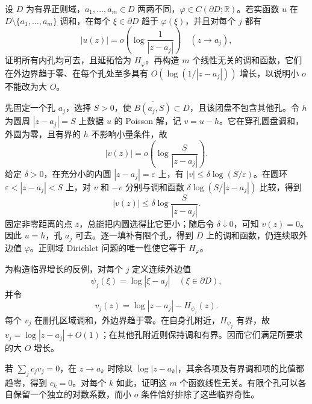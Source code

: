 \begin{exercise}[有限内孔的小对数增长与唯一性]\label{b3:ex:16-draft-04}
设 \(D\) 为有界正则域，\(a_1,\ldots,a_m\in D\) 两两不同，\(\varphi\in C(\partial D;\mathbb R)\)。若实函数 \(u\) 在 \(D\setminus\{a_1,\ldots,a_m\}\) 调和，在每个 \(\xi\in\partial D\) 趋于 \(\varphi(\xi)\)，并且对每个 \(j\) 都有
\[
 |u(z)|=o\!\left(\log\frac1{|z-a_j|}\right)\quad(z\to a_j),
\]
证明所有内孔均可去，且延拓恰为 \(H_\varphi\)。再构造 \(m\) 个线性无关的调和函数，它们在外边界趋于零、在每个孔处至多具有 \(O(\log(1/|z-a_j|))\) 增长，以说明小 \(o\) 不能改为大 \(O\)。
\end{exercise}
\begin{solution}
先固定一个孔 \(a_j\)，选择 \(S>0\)，使 \(\overline{B(a_j,S)}\subset D\)，且该闭盘不包含其他孔。令 \(h\) 为圆周 \(|z-a_j|=S\) 上数据 \(u\) 的 Poisson 解，记 \(v=u-h\)。它在穿孔圆盘调和，外圆为零，且有界的 \(h\) 不影响小量条件，故
\[
 |v(z)|=o\!\left(\log\frac S{|z-a_j|}\right).
\]
给定 \(\delta>0\)，在充分小的内圆 \(|z-a_j|=\varepsilon\) 上，有 \(|v|\le\delta\log(S/\varepsilon)\)。在圆环 \(\varepsilon<|z-a_j|<S\) 上，对 \(v\) 和 \(-v\) 分别与调和函数 \(\delta\log(S/|z-a_j|)\) 比较，得到
\[
 |v(z)|\le\delta\log\frac S{|z-a_j|}.
\]
固定非零距离的点 \(z\)，总能把内圆选得比它更小；随后令 \(\delta\downarrow0\)，可知 \(v(z)=0\)。因此 \(u=h\)，孔 \(a_j\) 可去。逐一填补有限个孔，得到 \(D\) 上的调和函数，仍连续取外边值 \(\varphi\)。正则域 Dirichlet 问题的唯一性使它等于 \(H_\varphi\)。

为构造临界增长的反例，对每个 \(j\) 定义连续外边值
\[
 \psi_j(\xi)=\log|\xi-a_j|\quad(\xi\in\partial D),
\]
并令
\[
 v_j(z)=\log|z-a_j|-H_{\psi_j}(z).
\]
每个 \(v_j\) 在删孔区域调和，外边界趋于零。在自身孔附近，\(H_{\psi_j}\) 有界，故 \(v_j=\log|z-a_j|+O(1)\)；在其他孔附近则保持调和有界。因而它们满足所要求的大 \(O\) 增长。

若 \(\sum_j c_jv_j=0\)，在 \(z\to a_k\) 时除以 \(\log|z-a_k|\)，其余各项及有界调和项的比值都趋零，得到 \(c_k=0\)。对每个 \(k\) 如此，证明这 \(m\) 个函数线性无关。有限个孔可以各自保留一个独立的对数系数，而小 \(o\) 条件恰好排除了这些临界奇性。
\end{solution}

